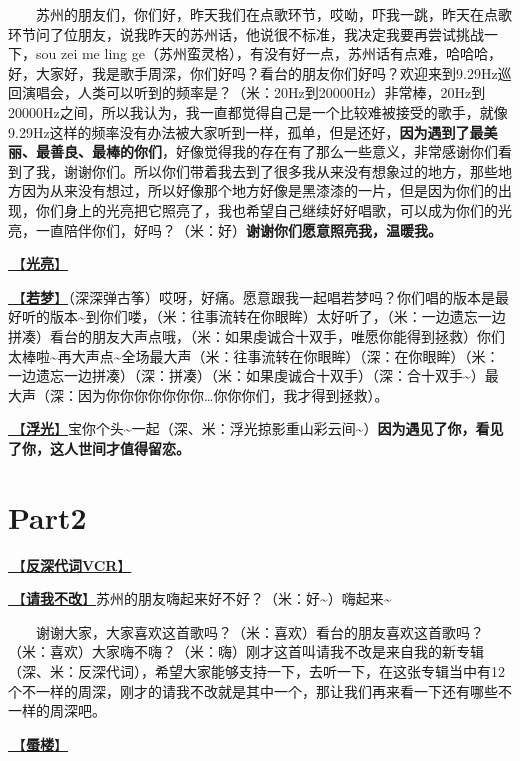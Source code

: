 \documentclass[]{ctexbook}
\begin{document}
  苏州的朋友们，你们好，昨天我们在点歌环节，哎呦，吓我一跳，昨天在点歌环节问了位朋友，说我昨天的苏州话，他说很不标准，我决定我要再尝试挑战一下，sou zei me ling ge（苏州蛮灵格），有没有好一点，苏州话有点难，哈哈哈，好，大家好，我是歌手周深，你们好吗？看台的朋友你们好吗？欢迎来到9.29Hz巡回演唱会，人类可以听到的频率是？（米：20Hz到20000Hz）非常棒，20Hz到20000Hz之间，所以我认为，我一直都觉得自己是一个比较难被接受的歌手，就像9.29Hz这样的频率没有办法被大家听到一样，孤单，但是还好，\textbf{因为遇到了最美丽、最善良、最棒的你们}，好像觉得我的存在有了那么一些意义，非常感谢你们看到了我，谢谢你们。所以你们带着我去到了很多我从来没有想象过的地方，那些地方因为从来没有想过，所以好像那个地方好像是黑漆漆的一片，但是因为你们的出现，你们身上的光亮把它照亮了，我也希望自己继续好好唱歌，可以成为你们的光亮，一直陪伴你们，好吗？（米：好）\textbf{谢谢你们愿意照亮我，温暖我。}

\hyperref[silver-linings]{🎵【\textbf{光亮}】}

\hyperref[ruomeng]{🎵【\textbf{若梦}】}（深深弹古筝）哎呀，好痛。愿意跟我一起唱若梦吗？你们唱的版本是最好听的版本\textasciitilde 到你们喽，（米：往事流转在你眼眸）太好听了，（米：一边遗忘一边拼凑）看台的朋友大声点哦，（米：如果虔诚合十双手，唯愿你能得到拯救）你们太棒啦\textasciitilde 再大声点\textasciitilde 全场最大声（米：往事流转在你眼眸）（深：在你眼眸）（米：一边遗忘一边拼凑）（深：拼凑）（米：如果虔诚合十双手）（深：合十双手\textasciitilde）最大声（深：因为你你你你你你你\ldots 你你你们，我才得到拯救）。

\hyperref[floating-light]{🎵【\textbf{浮光}】}宝你个头\textasciitilde 一起（深、米：浮光掠影重山彩云间\textasciitilde）\textbf{因为遇见了你，看见了你，这人世间才值得留恋。}

\section{Part2}\label{suzhou-20241110-part2}

\hyperref[senself-vcr]{🎥【\textbf{反深代词VCR}】}

\hyperref[brave-heart]{🎵【\textbf{请我不改}】}苏州的朋友嗨起来好不好？（米：好\textasciitilde）嗨起来\textasciitilde{}

  谢谢大家，大家喜欢这首歌吗？（米：喜欢）看台的朋友喜欢这首歌吗？（米：喜欢）大家嗨不嗨？（米：嗨）刚才这首叫请我不改是来自我的新专辑（深、米：反深代词），希望大家能够支持一下，去听一下，在这张专辑当中有12个不一样的周深，刚才的请我不改就是其中一个，那让我们再来看一下还有哪些不一样的周深吧。

\hyperref[mirage]{🎵【\textbf{蜃楼}】}
\end{document}
